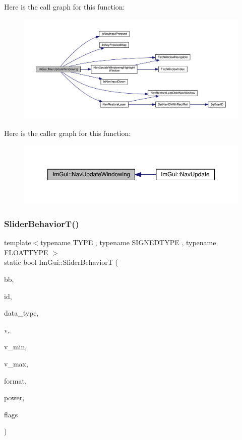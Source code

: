 Here is the call graph for this function\+:
\nopagebreak
\begin{figure}[H]
\begin{center}
\leavevmode
\includegraphics[width=350pt]{df/d13/namespace_im_gui_ad00213b916de0bc1519d6d20259391cf_cgraph}
\end{center}
\end{figure}
Here is the caller graph for this function\+:
\nopagebreak
\begin{figure}[H]
\begin{center}
\leavevmode
\includegraphics[width=350pt]{df/d13/namespace_im_gui_ad00213b916de0bc1519d6d20259391cf_icgraph}
\end{center}
\end{figure}
\mbox{\label{namespace_im_gui_addfe850a41dd51c7d0d7ac06742133db}} 
\subsubsection{\texorpdfstring{Slider\+Behavior\+T()}{SliderBehaviorT()}}
{\footnotesize\ttfamily template$<$typename T\+Y\+PE , typename S\+I\+G\+N\+E\+D\+T\+Y\+PE , typename F\+L\+O\+A\+T\+T\+Y\+PE $>$ \\
static bool Im\+Gui\+::\+Slider\+BehaviorT (\begin{DoxyParamCaption}\item[{const Im\+Rect \&}]{bb,  }\item[{Im\+Gui\+ID}]{id,  }\item[{Im\+Gui\+Data\+Type}]{data\+\_\+type,  }\item[{T\+Y\+PE $\ast$}]{v,  }\item[{const T\+Y\+PE}]{v\+\_\+min,  }\item[{const T\+Y\+PE}]{v\+\_\+max,  }\item[{const char $\ast$}]{format,  }\item[{float}]{power,  }\item[{Im\+Gui\+Slider\+Flags}]{flags }\end{DoxyParamCaption})\hspace{0.3cm}{\ttfamily [static]}}

